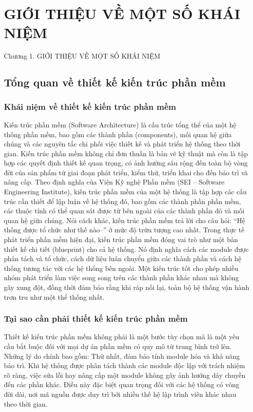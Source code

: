 \chapter{GIỚI THIỆU VỀ MỘT SỐ KHÁI NIỆM}

Chương 1. GIỚI THIỆU VỀ MỘT SỐ KHÁI NIỆM

\section{Tổng quan về thiết kế kiến trúc phần mềm}

\subsection{Khái niệm về thiết kế kiến trúc phần mềm}

Kiến trúc phần mềm (Software Architecture) là cấu trúc tổng thể của một hệ thống phần mềm, bao gồm các thành phần (components), mối quan hệ giữa chúng và các nguyên tắc chi phối việc thiết kế và phát triển hệ thống theo thời gian. Kiến trúc phần mềm không chỉ đơn thuần là bản vẽ kỹ thuật mà còn là tập hợp các quyết định thiết kế quan trọng, có ảnh hưởng sâu rộng đến toàn bộ vòng đời của sản phẩm từ giai đoạn phát triển, kiểm thử, triển khai cho đến bảo trì và nâng cấp. Theo định nghĩa của Viện Kỹ nghệ Phần mềm (SEI – Software Engineering Institute), kiến trúc phần mềm của một hệ thống là tập hợp các cấu trúc cần thiết để lập luận về hệ thống đó, bao gồm các thành phần phần mềm, các thuộc tính có thể quan sát được từ bên ngoài của các thành phần đó và mối quan hệ giữa chúng. Nói cách khác, kiến trúc phần mềm trả lời cho câu hỏi: “Hệ thống được tổ chức như thế nào--” ở mức độ trừu tượng cao nhất. Trong thực tế phát triển phần mềm hiện đại, kiến trúc phần mềm đóng vai trò như một bản thiết kế chi tiết (blueprint) cho cả hệ thống. Nó định nghĩa cách các module được phân tách và tổ chức, cách dữ liệu luân chuyển giữa các thành phần và cách hệ thống tương tác với các hệ thống bên ngoài. Một kiến trúc tốt cho phép nhiều nhóm phát triển làm việc song song trên các thành phần khác nhau mà không gây xung đột, đồng thời đảm bảo rằng khi ráp nối lại, toàn bộ hệ thống vận hành trơn tru như một thể thống nhất.

\subsection{Tại sao cần phải thiết kế kiến trúc phần mềm}

Thiết kế kiến trúc phần mềm không phải là một bước tùy chọn mà là một yêu cầu bắt buộc đối với mọi dự án phần mềm có quy mô từ trung bình trở lên. Những lý do chính bao gồm: Thứ nhất, đảm bảo tính module hóa và khả năng bảo trì. Khi hệ thống được phân tách thành các module độc lập với trách nhiệm rõ ràng, việc sửa lỗi hay nâng cấp một module không gây ảnh hưởng dây chuyền đến các phần khác. Điều này đặc biệt quan trọng đối với các hệ thống có vòng đời dài, nơi mã nguồn được duy trì bởi nhiều thế hệ lập trình viên khác nhau theo thời gian.

